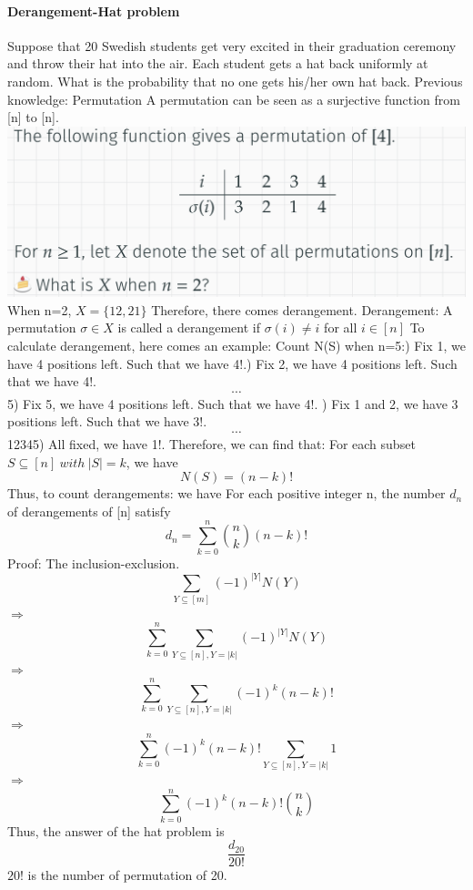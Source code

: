 \documentclass{article}
\begin{document}
\paragraph{Derangement-Hat problem}
Suppose that 20 Swedish students get very excited in their graduation ceremony and throw their hat into the air.\newline
Each student gets a hat back uniformly at random.\newline
What is the probability that no one gets his/her own hat back.\newline
Previous knowledge: Permutation \newline
A permutation can be seen as a surjective function from [n] to [n].\newline
\includegraphics{0005}\newline
When n=2, $X=\{12,21\}$
Therefore, there comes derangement.\newline
Derangement:\newline
A permutation $\sigma \in X$ is called a derangement if $\sigma (i) \neq i$ for all $i\in [n]$\newline
To calculate derangement, here comes an example:\newline
Count N(S) when n=5:) Fix 1, we have 4 positions left. Such that we have 4!.) Fix 2, we have 4 positions left. Such that we have 4!. \newline
$$\cdots $$
5) Fix 5, we have 4 positions left. Such that we have 4!. ) Fix 1 and 2, we have 3 positions left. Such that we have 3!.
$$\cdots$$
12345) All fixed, we have 1!.\newline
Therefore, we can find that:\newline
For each subset $S\subseteq [n] \ with \ |S|=k$, we have $$N(S)=(n-k)!$$
Thus, to count derangements: we have \newline
For each positive integer  n, the number $d_n$ of derangements of [n] satisfy $$d_n=\sum^{n}_{k=0}\binom{n}{k}(n-k)!$$
Proof: The inclusion-exclusion. \newline
$$\sum_{Y\subseteq [m]}(-1)^{|Y|}N(Y)$$
$\Longrightarrow$
$$\sum_{k=0}^{n}\sum_{Y\subseteq [n],Y=|k|}(-1)^{|Y|}N(Y)$$
$\Longrightarrow$
$$\sum_{k=0}^{n}\sum_{Y\subseteq [n],Y=|k|}(-1)^{k}(n-k)!$$
$\Longrightarrow$
$$\sum_{k=0}^{n}(-1)^{k}(n-k)!\sum_{Y\subseteq [n],Y=|k|}1$$
$\Longrightarrow$
$$\sum_{k=0}^{n}(-1)^{k}(n-k)!\binom{n}{k}$$
Thus, the answer of the hat problem is
$$\frac{d_{20}}{20!}$$
$20!$ is the number of permutation of 20.
\end{document}
